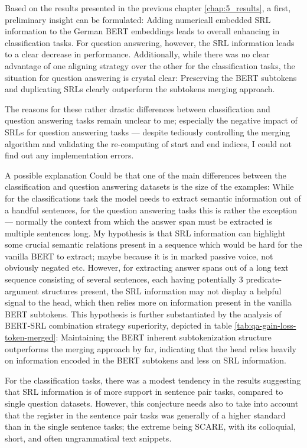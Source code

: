 \label{chap:5_discussion}


Based on the results presented in the previous chapter \ref{chap:5_results}, a first, preliminary
insight can be formulated: Adding numericall embedded SRL information to the German  BERT embeddings
leads to overall enhancing in classification tasks. For question answering, however, the SRL information
leads to a clear decrease in performance. Additionally, while there was no clear advantage of one aligning strategy
over the other for the classification tasks, the situation for question answering is crystal clear: Preserving
the BERT subtokens and duplicating SRLs clearly outperform the subtokens merging approach.

The reasons for these rather drastic differences between classification and question answering
tasks remain unclear to me; especially the negative impact of SRLs for question answering tasks
--- despite tediously controlling the merging algorithm and validating the re-computing of start
and end indices, I could not find out any implementation errors.

A possible explanation Could be that one of the main differences between
the classification and question answering datasets is the size of the examples: While for
the classifications task the model needs to extract semantic information out of a handful
sentences, for the question answering tasks this is rather the exception --- normally
the context from which the answer span must be extracted is multiple sentences long. My
hypothesis is that SRL information can highlight some crucial semantic relations present in a
sequence which would be hard for the vanilla BERT to extract; maybe because it is in marked
passive voice, not obviously negated etc. However, for extracting answer spans out of a long
text sequence consisting of several sentences, each having potentially 3 predicate-argument
structures present, the SRL information may not display a helpful signal to the head, which
then relies more on information present in the vanilla BERT subtokens. This hypothesis is
further substantiated by the analysis of BERT-SRL combination strategy superiority, depicted
in table \ref{tab:qa-gain-loss-token-merged}: Maintaining the BERT inherent subtokenization
structure outperforms the merging approach by far, indicating that the head relies heavily
on information encoded in the BERT subtokens and less on SRL information.

For the classification tasks, there was a modest tendency in the results suggesting that
SRL information is of more support in sentence pair tasks, compared to single question datasets.
However, this conjecture needs also to take into account that the register in the sentence
pair tasks was generally of a higher standard than in the single sentence tasks; the
extreme being SCARE, with its colloquial, short, and often ungrammatical text snippets.

